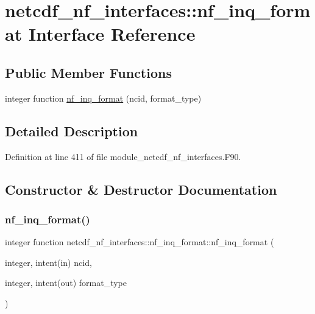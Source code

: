 \hypertarget{interfacenetcdf__nf__interfaces_1_1nf__inq__format}{}\section{netcdf\+\_\+nf\+\_\+interfaces\+:\+:nf\+\_\+inq\+\_\+format Interface Reference}
\label{interfacenetcdf__nf__interfaces_1_1nf__inq__format}
\subsection*{Public Member Functions}
\begin{DoxyCompactItemize}
\item 
integer function \hyperlink{interfacenetcdf__nf__interfaces_1_1nf__inq__format_aff553def9bbbb0b233581f70890b7f62}{nf\+\_\+inq\+\_\+format} (ncid, format\+\_\+type)
\end{DoxyCompactItemize}


\subsection{Detailed Description}


Definition at line 411 of file module\+\_\+netcdf\+\_\+nf\+\_\+interfaces.\+F90.



\subsection{Constructor \& Destructor Documentation}
\mbox{\label{interfacenetcdf__nf__interfaces_1_1nf__inq__format_aff553def9bbbb0b233581f70890b7f62}} 
\subsubsection{\texorpdfstring{nf\+\_\+inq\+\_\+format()}{nf\_inq\_format()}}
{\footnotesize\ttfamily integer function netcdf\+\_\+nf\+\_\+interfaces\+::nf\+\_\+inq\+\_\+format\+::nf\+\_\+inq\+\_\+format (\begin{DoxyParamCaption}\item[{integer, intent(in)}]{ncid,  }\item[{integer, intent(out)}]{format\+\_\+type }\end{DoxyParamCaption})}



